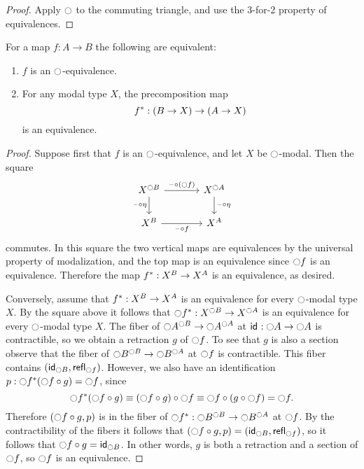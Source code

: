 \documentclass[9pt,twosided]{amsart}
\begin{document}
\begin{proof}
Apply $\modal$ to the commuting triangle, and use the 3-for-2 property of equivalences.
\end{proof}

\begin{lem}\label{lem:modal_equivalence}
For a map $f : A \to B$ the following are equivalent:
\begin{enumerate}
\item $f$ is an $\modal$-equivalence.
\item For any modal type $X$, the precomposition map
\begin{equation*}
\precomp{f} : (B \to X) \to (A \to X)
\end{equation*}
is an equivalence.
\end{enumerate}
\end{lem}

\begin{proof} 
Suppose first that $f$ is an $\modal$-equivalence, and let $X$ be $\modal$-modal. Then the square
\begin{equation*}
\begin{tikzcd}[column sep=large]
X^{\modal B} \arrow[r,"\blank\circ (\modal f)"] \arrow[d,swap,"\blank\circ\eta"] & X^{\modal A} \arrow[d,"\blank\circ\eta"] \\
X^{B} \arrow[r,swap,"\blank\circ f"] & X^A
\end{tikzcd}
\end{equation*}
commutes. In this square the two vertical maps are equivalences by the universal property of modalization, and the top map is an equivalence since $\modal f$ is an equivalence. Therefore the map $\precomp{f}:X^B\to X^A$ is an equivalence, as desired.

Conversely, assume that $\precomp{f} : X^B \to X^A$ is an equivalence for every $\modal$-modal type $X$. By the square above it follows that $\precomp{\modal f}:X^{\modal B}\to X^{\modal A}$ is an equivalence for every $\modal$-modal type $X$. The fiber of $\modal A^{\modal B}\to \modal A^{\modal A}$ at $\idfunc:\modal A\to \modal A$ is contractible, so we obtain a retraction $g$ of $\modal f$. To see that $g$ is also a section observe that the fiber of $\modal B^{\modal B}\to \modal B^{\modal A}$ at $\modal f$ is contractible. This fiber contains $(\idfunc[\modal B],\refl{\modal f})$. However, we also have an identification $p:\precomp{\modal f}(\modal f\circ g)=\modal f$, since
\begin{equation*}
\precomp{\modal f}(\modal f\circ g)\jdeq (\modal f \circ g)\circ \modal f\jdeq \modal f \circ (g\circ \modal f) = \modal f. 
\end{equation*}
Therefore $(\modal f\circ g,p)$ is in the fiber of $\precomp{\modal f}:\modal B^{\modal B}\to \modal B^{\modal A}$ at $\modal f$. By the contractibility of the fibers it follows that $(\modal f\circ g,p)=(\idfunc[\modal B],\refl{\modal f})$, so it follows that $\modal f\circ g=\idfunc[\modal B]$. In other words, $g$ is both a retraction and a section of $\modal f$, so $\modal f$ is an equivalence.
\end{proof}
\end{document}
